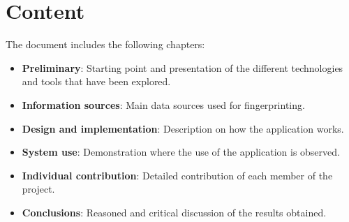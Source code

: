 \section{Content}
The document includes the following chapters:
\begin{itemize}
    \item \textbf{Preliminary}: Starting point and presentation of the different technologies and tools that have been explored.
    \item \textbf{Information sources}: Main data sources used for fingerprinting.
    \item \textbf{Design and implementation}: Description on how the application works.
    \item \textbf{System use}: Demonstration where the use of the application is observed.
    \item \textbf{Individual contribution}: Detailed contribution of each member of the project.
    \item \textbf{Conclusions}: Reasoned and critical discussion of the results obtained.
\end{itemize}